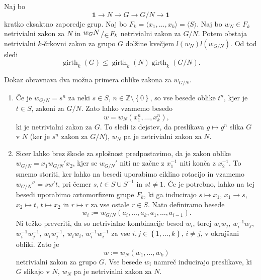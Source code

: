 \documentclass[mat1, tisk]{fmfdelo}
\newcommand{\bigslant}[2]{{\raisebox{.2em}{$#1$}\left/\raisebox{-.2em}{$#2$}\right.}}
\numberwithin{equation}{section}  %
\begin{document}
\begin{lema}\label{lem_razsiritvena_lema}
    Naj bo \begin{equation*}
        \mathbf{1} \to N \to G \to G / N \to  \mathbf{1}  
    \end{equation*}  
    kratko eksaktno zaporedje grup. Naj bo $F_k = \langle x_1, \ldots, x_k \rangle  = \langle S \rangle$. Naj bo $w_N \in F_k$ netrivialni zakon za $N$ in $\bigslant{w_{G}{N}} \in  F_k$ netrivialni zakon za $G / N$. 
    Potem obstaja netrivialni $k$-črkovni zakon za grupo $G$ dolžine kvečjem $l(w_N) l( w_{ G / N } )$. Od tod sledi \begin{equation*}
    \operatorname{girth}_{k}(G) \le \operatorname{girth}_{k}(N) \operatorname{girth}_{k}( G / N ). 
    \end{equation*}  
\end{lema}
\begin{dokaz}
    Dokaz obravnava dva možna primera oblike zakona za $w_{ G / N }$. 
    \begin{enumerate}
        \item Če je $w_{ G / N } = s^{n}$ za neki $s \in S$, $n \in  \mathbb{Z} \setminus \left\{ 0\right\} $, so vse besede oblike $t^{n}$, kjer je $t \in S$, zakoni za $G / N$. Zato lahko vzamemo besedo \begin{equation*}
        w = w_N(x_1^{n}, \ldots, x_{k}^{n}),
        \end{equation*}  
        ki je netrivialni zakon za $G$. To sledi iz dejstev, da preslikava $g \mapsto g^{n}$ slika $G$ v $N$ (ker je $s^{n}$ zakon za $G / N$), $w_N$ pa je netrivialni zakon za $N$.    
    \item Sicer lahko brez škode za splošnost predpostavimo, da je zakon oblike $w_{ G / N} = x_1 w_{ G / N}' x_2$, kjer se $w_{ G / N}'$ niti ne začne z $x_1^{-1}$ niti konča z $x_2^{-1}$. To smemo storiti, ker lahko na besedi uporabimo ciklino rotacijo in vzamemo 
    $w_{ G / N}'' = s w' t$, pri čemer $s, t \in  S \cup  S^{-1}$ in $st \neq 1$. Če je potrebno, lahko na tej besedi uporabimo avtomorfizem grupe $F_k$, ki ga inducirajo $s \mapsto x_1$, $x_1 \to s$, $x_2 \mapsto t$, $t \mapsto x_2$ in $r \mapsto r$ za vse ostale $r \in S$.  
   Nato definiramo besede \begin{equation*}
   w_i := w_{ G / N}(a_{i}, \ldots, a_{k}, a_1, \ldots, a_{i - 1}). 
   \end{equation*}  
   Ni težko preveriti, da so netrivialne kombinacije besed $w_i$, torej $w_{i} w_{j}$, $w_{i}^{-1} w_{j}$, $w_{i}^{-1} w_{j}^{-1}$, $w_{i} w_{j}^{-1}$, $w_{i} w_{i}$, $w_{i}^{-1} w_{i}^{-1}$ za vse $i,j \in \left\{ 1, \ldots, k \right\}, \, i \neq j$, v okrajšani obliki.
   Zato je \begin{equation*}
   w := w_N (w_1, \ldots, w_{k})
   \end{equation*}  
    netrivialni zakon za grupo $G$. Vse besede $w_{i}$ namreč inducirajo preslikave, ki $G$ slikajo v $N$, $w_N$ pa je netrivialni zakon za $N$.       
    \end{enumerate}
\end{dokaz}
\end{document}
